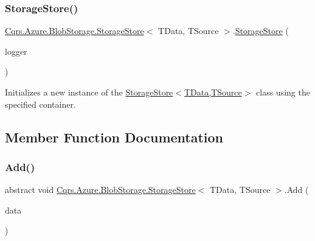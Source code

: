 \subsubsection{\texorpdfstring{Storage\+Store()}{StorageStore()}}
{\footnotesize\ttfamily \hyperlink{classCqrs_1_1Azure_1_1BlobStorage_1_1StorageStore}{Cqrs.\+Azure.\+Blob\+Storage.\+Storage\+Store}$<$ T\+Data, T\+Source $>$.\hyperlink{classCqrs_1_1Azure_1_1BlobStorage_1_1StorageStore}{Storage\+Store} (\begin{DoxyParamCaption}\item[{I\+Logger}]{logger }\end{DoxyParamCaption})\hspace{0.3cm}{\ttfamily [protected]}}



Initializes a new instance of the \hyperlink{classCqrs_1_1Azure_1_1BlobStorage_1_1StorageStore_ae7a725cdcb7de73e097b02c19463bae7_ae7a725cdcb7de73e097b02c19463bae7}{Storage\+Store$<$\+T\+Data,\+T\+Source$>$} class using the specified container. 



\subsection{Member Function Documentation}
\mbox{\label{classCqrs_1_1Azure_1_1BlobStorage_1_1StorageStore_af56bdbd7fa6650aaef5c0bab9ed55f1a_af56bdbd7fa6650aaef5c0bab9ed55f1a}} 
\subsubsection{\texorpdfstring{Add()}{Add()}\hspace{0.1cm}{\footnotesize\ttfamily [1/2]}}
{\footnotesize\ttfamily abstract void \hyperlink{classCqrs_1_1Azure_1_1BlobStorage_1_1StorageStore}{Cqrs.\+Azure.\+Blob\+Storage.\+Storage\+Store}$<$ T\+Data, T\+Source $>$.Add (\begin{DoxyParamCaption}\item[{T\+Data}]{data }\end{DoxyParamCaption})\hspace{0.3cm}{\ttfamily [pure virtual]}}



